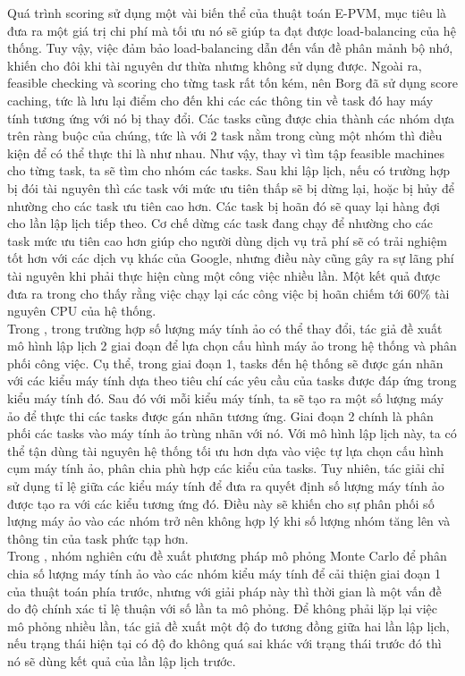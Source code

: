 \documentclass{my_style}
\begin{document}
Quá trình scoring sử dụng một vài biến thể của thuật toán E-PVM\cite{23}, mục tiêu là đưa ra một giá trị chi phí mà tối ưu nó sẽ giúp ta đạt được load-balancing của hệ thống. Tuy vậy, việc đảm bảo load-balancing dẫn đến vấn đề phân mảnh bộ nhớ, khiến cho đôi khi tài nguyên dư thừa nhưng không sử dụng được. Ngoài ra, feasible checking và scoring cho từng task rất tốn kém, nên Borg đã sử dụng score caching, tức là lưu lại điểm cho đến khi các các thông tin về task đó hay máy tính tương ứng với nó bị thay đổi. Các tasks cũng được chia thành các nhóm dựa trên ràng buộc của chúng, tức là với 2 task nằm trong cùng một nhóm thì điều kiện để có thể thực thi là như nhau. Như vậy, thay vì tìm tập feasible machines cho từng task, ta sẽ tìm cho nhóm các tasks. Sau khi lập lịch, nếu có trường hợp bị đói tài nguyên thì các task với mức ưu tiên thấp sẽ bị dừng lại, hoặc bị hủy để nhường cho các task ưu tiên cao hơn. Các task bị hoãn đó sẽ quay lại hàng đợi cho lần lập lịch tiếp theo. Cơ chế dừng các task đang chạy để nhường cho các task mức ưu tiên cao hơn giúp cho người dùng dịch vụ trả phí sẽ có trải nghiệm tốt hơn với các dịch vụ khác của Google, nhưng điều này cũng gây ra sự lãng phí tài nguyên khi phải thực hiện cùng một công việc nhiều lần. Một kết quả được đưa ra trong \cite{24} cho thấy rằng việc chạy lại các công việc bị hoãn chiếm tới 60\% tài nguyên CPU của hệ thống.  \\
Trong \cite{25}, trong trường hợp số lượng máy tính ảo có thể thay đổi, tác giả đề xuất mô hình lập lịch 2 giai đoạn để lựa chọn cấu hình máy ảo trong hệ thống và phân phối công việc. Cụ thể, trong giai đoạn 1, tasks đến hệ thống sẽ được gán nhãn với các kiểu máy tính dựa theo tiêu chí các yêu cầu của tasks được đáp ứng trong kiểu máy tính đó. Sau đó với mỗi kiểu máy tính, ta sẽ tạo ra một số lượng máy ảo để thực thi các tasks được gán nhãn tương ứng. Giai đoạn 2 chính là phân phối các tasks vào máy tính ảo trùng nhãn với nó. Với mô hình lập lịch này, ta có thể tận dùng tài nguyên hệ thống tối ưu hơn dựa vào việc tự lựa chọn cấu hình cụm máy tính ảo, phân chia phù hợp các kiểu của tasks. Tuy nhiên, tác giải chỉ sử dụng tỉ lệ giữa các kiểu máy tính để đưa ra quyết định số lượng máy tính ảo được tạo ra với các kiểu tương ứng đó. Điều này sẽ khiến cho sự phân phối số lượng máy ảo vào các nhóm trở nên không hợp lý khi số lượng nhóm tăng lên và thông tin của task phức tạp hơn. \\
Trong \cite{26}, nhóm nghiên cứu đề xuất phương pháp mô phỏng Monte Carlo để phân chia số lượng máy tính ảo vào các nhóm kiểu máy tính để cải thiện giai đoạn 1 của thuật toán phía trước, nhưng với giải pháp này thì thời gian là một vấn đề do độ chính xác tỉ lệ thuận với số lần ta mô phỏng. Để không phải lặp lại việc mô phỏng nhiều lần, tác giả đề xuất một độ đo tương đồng giữa hai lần lập lịch, nếu trạng thái hiện tại có độ đo không quá sai khác với trạng thái trước đó thì nó sẽ dùng kết quả của lần lập lịch trước. \\
\end{document}
